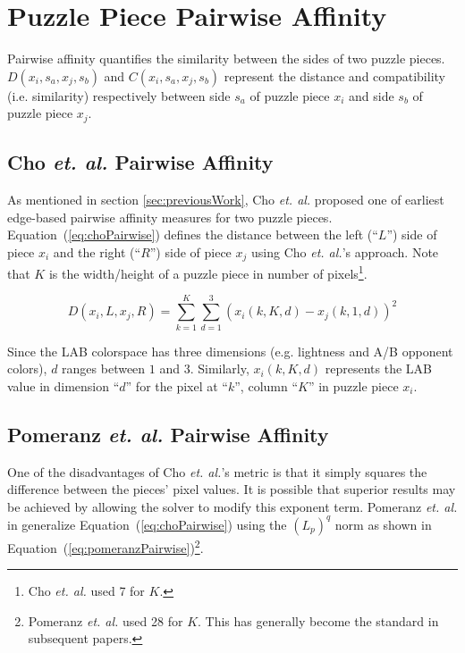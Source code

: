 \documentclass{report}
\def\eref#1{(\ref{#1})}
\begin{document}

\pagebreak
\section{Puzzle Piece Pairwise Affinity}\label{sec:piecePairwiseAffinity}

Pairwise affinity quantifies the similarity between the sides of two puzzle pieces.  $D(x_i, s_a, x_j, s_b)$ and $C(x_i, s_a, x_j, s_b)$ represent the distance and compatibility (i.e. similarity) respectively between side $s_a$ of puzzle piece $x_i$ and side $s_b$ of puzzle piece $x_j$.  

\subsection{Cho \textit{et. al.} Pairwise Affinity}\label{sec:choPairwiseAffinity}

As mentioned in section \ref{sec:previousWork}, Cho \textit{et. al.} \cite{cho2010} proposed one of earliest edge-based pairwise affinity measures for two puzzle pieces.  Equation~\eref{eq:choPairwise} defines the distance between the left (``$L$'') side of piece $x_i$ and the right (``$R$'') side of piece $x_j$ using Cho \textit{et. al.}'s approach.  Note that $K$ is the width/height of a puzzle piece in number of pixels\footnote{Cho \textit{et. al.} used 7 for $K$.}.  

\begin{equation} \label{eq:choPairwise}
D(x_i,L,x_j,R) = \sum_{k=1}^{K}\sum_{d=1}^{3}(x_i(k,K,d) - x_j(k,1,d))^2
\end{equation}

Since the LAB colorspace has three dimensions (e.g. lightness and A/B opponent colors), $d$ ranges between $1$ and $3$.  Similarly, $x_i(k,K,d)$ represents the LAB value in dimension ``$d$'' for the pixel at ``$k$'', column ``$K$'' in puzzle piece $x_i$.

\subsection{Pomeranz \textit{et. al.} Pairwise Affinity}\label{sec:pomeranzPairwiseAffinity}

One of the disadvantages of Cho \textit{et. al.}'s metric is that it simply squares the difference between the pieces' pixel values.  It is possible that superior results may be achieved by allowing the solver to modify this exponent term.  Pomeranz \textit{et. al.} in \cite{pomeranz2011} generalize Equation~\eref{eq:choPairwise} using the $(L_p)^q$ norm as shown in Equation~\eref{eq:pomeranzPairwise}\footnote{Pomeranz \textit{et. al.} used 28 for $K$.  This has generally become the standard in subsequent papers.}.
\end{document}
